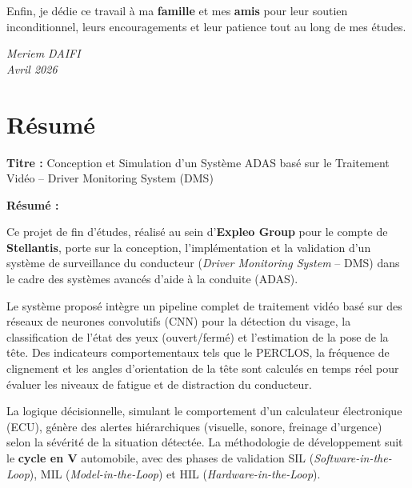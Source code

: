 \documentclass[12pt,a4paper,twoside]{report}
\begin{document}
\vspace{0.5cm}

Enfin, je dédie ce travail à ma \textbf{famille} et mes \textbf{amis} pour leur soutien inconditionnel, leurs encouragements et leur patience tout au long de mes études.

\vspace{2cm}

\begin{flushright}
\textit{Meriem DAIFI}\\
\textit{Avril 2026}
\end{flushright}


\chapter*{Résumé}

\vspace{0.5cm}

\noindent\textbf{Titre :} Conception et Simulation d'un Système ADAS basé sur le Traitement Vidéo -- Driver Monitoring System (DMS)

\vspace{0.5cm}

\noindent\textbf{Résumé :}

Ce projet de fin d'études, réalisé au sein d'\textbf{Expleo Group} pour le compte de \textbf{Stellantis}, porte sur la conception, l'implémentation et la validation d'un système de surveillance du conducteur (\textit{Driver Monitoring System} -- DMS) dans le cadre des systèmes avancés d'aide à la conduite (ADAS).

Le système proposé intègre un pipeline complet de traitement vidéo basé sur des réseaux de neurones convolutifs (CNN) pour la détection du visage, la classification de l'état des yeux (ouvert/fermé) et l'estimation de la pose de la tête. Des indicateurs comportementaux tels que le PERCLOS, la fréquence de clignement et les angles d'orientation de la tête sont calculés en temps réel pour évaluer les niveaux de fatigue et de distraction du conducteur.

La logique décisionnelle, simulant le comportement d'un calculateur électronique (ECU), génère des alertes hiérarchiques (visuelle, sonore, freinage d'urgence) selon la sévérité de la situation détectée. La méthodologie de développement suit le \textbf{cycle en V} automobile, avec des phases de validation SIL (\textit{Software-in-the-Loop}), MIL (\textit{Model-in-the-Loop}) et HIL (\textit{Hardware-in-the-Loop}).
\end{document}
